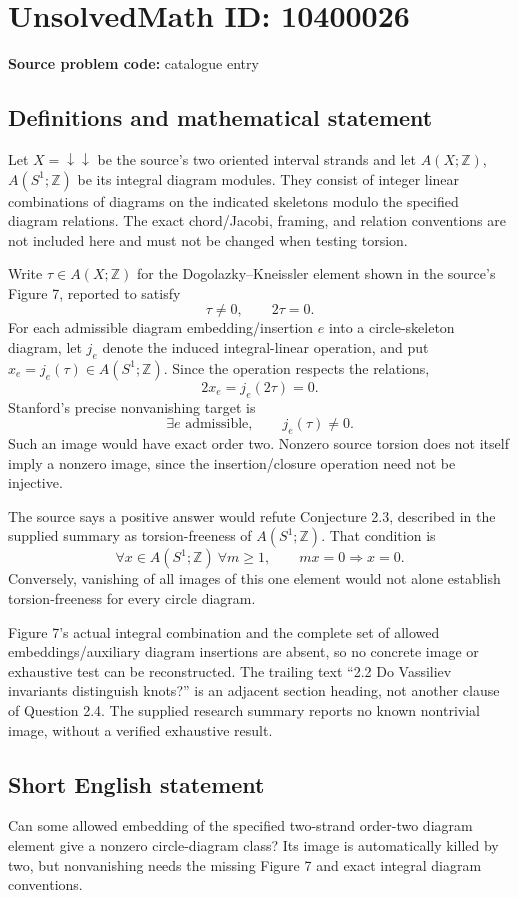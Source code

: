 \documentclass[11pt]{article}
\newcommand{\Z}{\mathbb{Z}}
\begin{document}
\section*{UnsolvedMath ID: 10400026}
\textbf{Source problem code:} catalogue entry
\subsection{Definitions and mathematical statement}
Let \(X=\downarrow\!\downarrow\) be the source's two oriented interval strands and let \(A(X;\Z)\), \(A(S^1;\Z)\) be its integral diagram modules. They consist of integer linear combinations of diagrams on the indicated skeletons modulo the specified diagram relations. The exact chord/Jacobi, framing, and relation conventions are not included here and must not be changed when testing torsion.

Write \(\tau\in A(X;\Z)\) for the Dogolazky--Kneissler element shown in the source's Figure 7, reported to satisfy
\[
\tau\ne0,\qquad2\tau=0.
\]
For each admissible diagram embedding/insertion \(e\) into a circle-skeleton diagram, let \(j_e\) denote the induced integral-linear operation, and put \(x_e=j_e(\tau)\in A(S^1;\Z)\). Since the operation respects the relations,
\[
2x_e=j_e(2\tau)=0.
\]
Stanford's precise nonvanishing target is
\[
\exists e\text{ admissible},\qquad j_e(\tau)\ne0.
\]
Such an image would have exact order two. Nonzero source torsion does not itself imply a nonzero image, since the insertion/closure operation need not be injective.

The source says a positive answer would refute Conjecture 2.3, described in the supplied summary as torsion-freeness of \(A(S^1;\Z)\). That condition is
\[
\forall x\in A(S^1;\Z)\ \forall m\ge1,\qquad mx=0\Longrightarrow x=0.
\]
Conversely, vanishing of all images of this one element would not alone establish torsion-freeness for every circle diagram.

Figure 7's actual integral combination and the complete set of allowed embeddings/auxiliary diagram insertions are absent, so no concrete image or exhaustive test can be reconstructed. The trailing text ``2.2 Do Vassiliev invariants distinguish knots?'' is an adjacent section heading, not another clause of Question 2.4. The supplied research summary reports no known nontrivial image, without a verified exhaustive result.
\subsection{Short English statement}
Can some allowed embedding of the specified two-strand order-two diagram element give a nonzero circle-diagram class? Its image is automatically killed by two, but nonvanishing needs the missing Figure 7 and exact integral diagram conventions.
\end{document}
